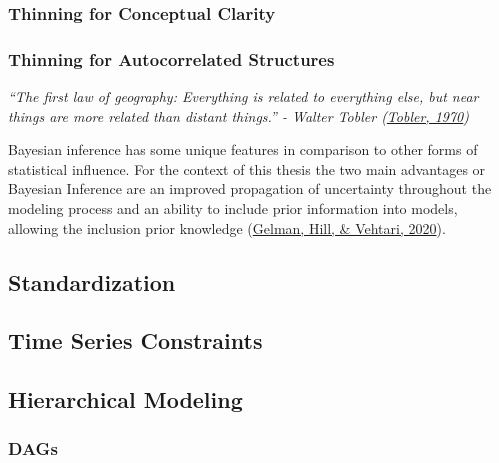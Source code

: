 \documentclass[12pt,twoside]{reedthesis}
\begin{document}
\hypertarget{nocrop}{%
\subsubsection{Thinning for Conceptual Clarity}\label{nocrop}}

\hypertarget{autocorr}{%
\subsubsection{Thinning for Autocorrelated Structures}\label{autocorr}}

\emph{``The first law of geography: Everything is related to everything else, but near things are more related than distant things.'' - Walter Tobler (\protect\hyperlink{ref-toblerComputerMovieSimulating1970}{Tobler, 1970})}

Bayesian inference has some unique features in comparison to other forms of statistical influence. For the context of this thesis the two main advantages or Bayesian Inference are an improved propagation of uncertainty throughout the modeling process and an ability to include prior information into models, allowing the inclusion prior knowledge (\protect\hyperlink{ref-gelmanRegressionOtherStories2020}{Gelman, Hill, \& Vehtari, 2020}).

\hypertarget{standardization}{%
\subsection{Standardization}\label{standardization}}

\hypertarget{time-series-constraints}{%
\subsection{Time Series Constraints}\label{time-series-constraints}}

\hypertarget{hierarchical-modeling}{%
\subsection{Hierarchical Modeling}\label{hierarchical-modeling}}

\hypertarget{dags}{%
\subsubsection{DAGs}\label{dags}}
\end{document}
